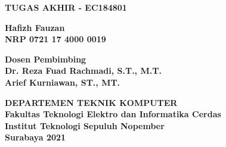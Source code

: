 \begin{flushleft}

  \sffamily

  \noindent\textbf{TUGAS AKHIR - EC184801}
  \vspace{6ex}

  \vspace{4ex}

  \noindent\textbf{Hafizh Fauzan} \\
  \textbf{NRP 0721 17 4000 0019}
  \vspace{2ex}

  \noindent\textbf{Dosen Pembimbing} \\
  \textbf{Dr. Reza Fuad Rachmadi, S.T., M.T.} \\
  \textbf{Arief Kurniawan, ST., MT.}
  \vspace{6ex}

  \noindent\textbf{DEPARTEMEN TEKNIK KOMPUTER} \\
  \textbf{Fakultas Teknologi Elektro dan Informatika Cerdas} \\
  \textbf{Institut Teknologi Sepuluh Nopember} \\
  \textbf{Surabaya 2021}

\end{flushleft}

\restoregeometry